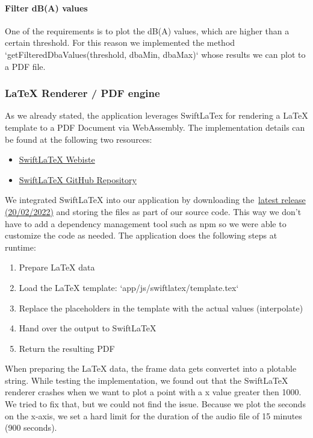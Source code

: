 \paragraph{Filter dB(A) values}
One of the requirements is to plot the dB(A) values, which are higher than a certain threshold.
For this reason we implemented the method `getFilteredDbaValues(threshold, dbaMin, dbaMax)` whose results we can plot to a PDF file.

\subsubsection{LaTeX Renderer / PDF engine}\label{subsubsec:latex-renderer-pdf-engine}
As we already stated, the application leverages SwiftLaTex for rendering a LaTeX template to a PDF Document via WebAssembly.
The implementation details can be found at the following two resources:

\begin{itemize}
    \item \href{https://www.swiftlatex.com/}{SwiftLaTeX Webiste}
    \item \href{https://github.com/SwiftLaTeX/SwiftLaTeX/}{SwiftLaTeX GitHub Repository}
\end{itemize}

We integrated SwiftLaTeX into our application by downloading the~\href{https://github.com/SwiftLaTeX/SwiftLaTeX/releases/tag/v20022022}{latest release (20/02/2022)}
and storing the files as part of our source code.
This way we don't have to add a dependency management tool such as npm so we were able to customize the code as needed.
The application does the following steps at runtime:
\begin{enumerate}
    \item Prepare LaTeX data
    \item Load the LaTeX template: `app/js/swiftlatex/template.tex`
    \item Replace the placeholders in the template with the actual values (interpolate)
    \item Hand over the output to SwiftLaTeX
    \item Return the resulting PDF
\end{enumerate}

When preparing the LaTeX data, the frame data gets convertet into a plotable string. While testing the implementation, we found out that the
SwiftLaTeX renderer crashes when we want to plot a point with a x value greater then 1000. We tried to fix that, but we could not find the issue. Because we plot the seconds on the x-axis, we set a hard limit for the duration of the audio file of 15 minutes (900 seconds). 

